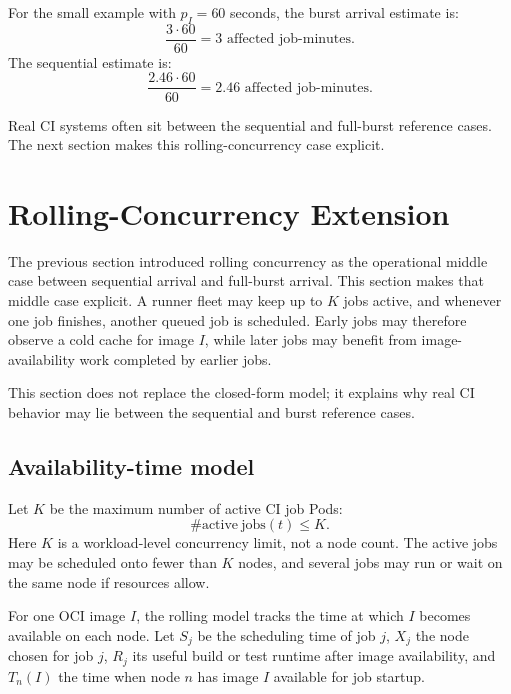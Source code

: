 \documentclass[11pt,a4paper]{article}
\begin{document}
For the small example with \(p_I=60\) seconds, the burst arrival estimate is:
\begin{equation}
  \frac{3\cdot 60}{60}=3
  \text{ affected job-minutes}.
\end{equation}
The sequential estimate is:
\begin{equation}
  \frac{2.46\cdot 60}{60}=2.46
  \text{ affected job-minutes}.
\end{equation}

Real CI systems often sit between the sequential and full-burst reference cases. The next section makes this rolling-concurrency case explicit.


\section{Rolling-Concurrency Extension}\label{sec:rolling-concurrency}

The previous section introduced rolling concurrency as the operational middle case between sequential arrival and full-burst arrival. This section makes that middle case explicit. A runner fleet may keep up to \(K\) jobs active, and whenever one job finishes, another queued job is scheduled. Early jobs may therefore observe a cold cache for image \(I\), while later jobs may benefit from image-availability work completed by earlier jobs.

This section does not replace the closed-form model; it explains why real CI behavior may lie between the sequential and burst reference cases.

\subsection{Availability-time model}

Let \(K\) be the maximum number of active CI job Pods:
\begin{equation}
  \#\mathrm{active\ jobs}(t) \le K.
\end{equation}
Here \(K\) is a workload-level concurrency limit, not a node count. The active jobs may be scheduled onto fewer than \(K\) nodes, and several jobs may run or wait on the same node if resources allow.

For one OCI image \(I\), the rolling model tracks the time at which \(I\) becomes available on each node. Let \(S_j\) be the scheduling time of job \(j\), \(X_j\) the node chosen for job \(j\), \(R_j\) its useful build or test runtime after image availability, and \(T_n(I)\) the time when node \(n\) has image \(I\) available for job startup.
\end{document}

